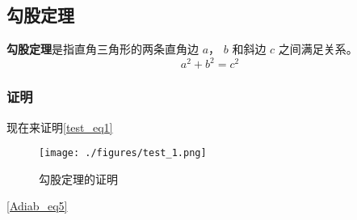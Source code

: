 
\subsection{勾股定理}
\textbf{勾股定理}是指直角三角形的两条直角边 $a$， $b$ 和斜边 $c$ 之间满足关系。
\begin{equation}\label{test_eq1}
a^2 + b^2 = c^2
\end{equation}

\subsubsection{证明}
现在来证明\autoref{test_eq1}

\begin{figure}[ht]
\centering
\texttt{[image: ./figures/test\_1.png]}
\caption{勾股定理的证明} \label{test_fig1}
\end{figure}

\autoref{Adiab_eq5}
